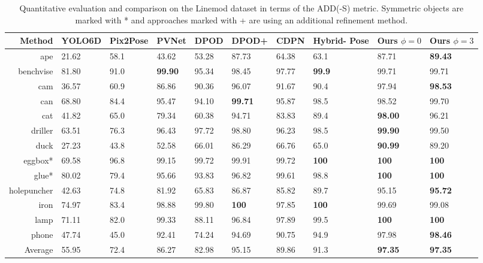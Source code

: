 \documentclass[twocolumn, 10pt, letterpaper]{article}
\begin{document}
\begin{table*}
\begin{tabularx}{\textwidth}{ | r | X  X  X  X  X  X  X | X  X |}
 \hline
 Method & YOLO6D \cite{YOLO6D} & Pix2Pose \cite{Pix2Pose} & PVNet \cite{PVNet} & DPOD \cite{DPOD} & DPOD+ \cite{DPOD} & CDPN \cite{CDPN} & Hybrid- Pose \cite{HybridPose} & \textbf{Ours} $\phi = 0$ & \textbf{Ours} $\phi = 3$  \\
 \hline
 ape            & 21.62 & 58.1 & 43.62 & 53.28 & 87.73 & 64.38 & 63.1 & 87.71 & \textbf{89.43} \\
 benchvise      & 81.80 & 91.0 & \textbf{99.90} & 95.34 & 98.45 & 97.77 & \textbf{99.9} & 99.71 & 99.71 \\
 cam            & 36.57 & 60.9 & 86.86 & 90.36 & 96.07 & 91.67 & 90.4 & 97.94 & \textbf{98.53} \\
 can            & 68.80 & 84.4 & 95.47 & 94.10 & \textbf{99.71} & 95.87 & 98.5 & 98.52 & 99.70 \\
 cat            & 41.82 & 65.0 & 79.34 & 60.38 & 94.71 & 83.83 & 89.4 & \textbf{98.00} & 96.21 \\
 driller        & 63.51 & 76.3 & 96.43 & 97.72 & 98.80 & 96.23 & 98.5 & \textbf{99.90} & 99.50 \\
 duck           & 27.23 & 43.8 & 52.58 & 66.01 & 86.29 & 66.76 & 65.0 & \textbf{90.99} & 89.20 \\
 eggbox*        & 69.58 & 96.8 & 99.15 & 99.72 & 99.91 & 99.72 & \textbf{100} & \textbf{100} & \textbf{100} \\
 glue*          & 80.02 & 79.4 & 95.66 & 93.83 & 96.82 & 99.61 & 98.8 & \textbf{100} & \textbf{100} \\
 holepuncher    & 42.63 & 74.8 & 81.92 & 65.83 & 86.87 & 85.82 & 89.7 & 95.15 & \textbf{95.72} \\
 iron           & 74.97 & 83.4 & 98.88 & 99.80 & \textbf{100} & 97.85 & \textbf{100} & 99.69 & 99.08 \\
 lamp           & 71.11 & 82.0 & 99.33 & 88.11 & 96.84 & 97.89 & 99.5 & \textbf{100} & \textbf{100} \\
 phone          & 47.74 & 45.0 & 92.41 & 74.24 & 94.69 & 90.75 & 94.9 & 97.98 & \textbf{98.46} \\
 \hline
 Average & 55.95 & 72.4 & 86.27 & 82.98 & 95.15 & 89.86 & 91.3 & \textbf{97.35} & \textbf{97.35} \\
 \hline
\end{tabularx}
\caption{Quantitative evaluation and comparison on the Linemod dataset in terms of the ADD(-S) metric. Symmetric objects are marked with * and approaches marked with + are using an additional refinement method.}
\label{table_linemod_comparison}
\end{table*}
\end{document}

